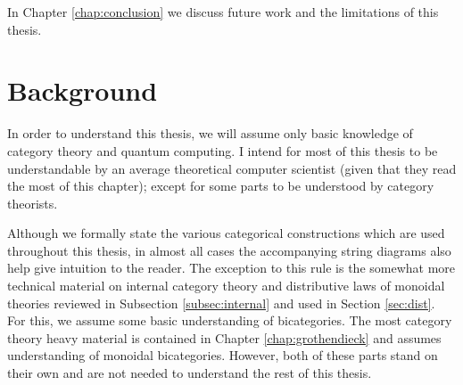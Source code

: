 \documentclass[12pt]{ociamthesis}  %
\begin{document}
In Chapter \ref{chap:conclusion} we discuss future work and the limitations of this thesis.


%
%
%
%



\chapter{Background}


\label{chap:background}
In order to understand this thesis, we will assume only basic knowledge of category theory and quantum computing.  I intend for most of this thesis to be understandable by an average theoretical computer scientist  (given that they read the most of this chapter); except for some parts to be understood by category theorists.


Although we formally state the various categorical constructions which are used throughout this thesis, in almost all cases the accompanying string diagrams also help give intuition to the reader.  The exception to this rule is the somewhat more technical  material on internal category theory and distributive laws of monoidal theories reviewed in Subsection \ref{subsec:internal} and used in Section \ref{sec:dist}.  For this, we assume some basic understanding of bicategories.  The most category theory heavy material is contained in Chapter \ref{chap:grothendieck} and assumes understanding of monoidal bicategories.  However, both of these parts stand on their own and are not needed to understand the rest of this thesis.
\end{document}
